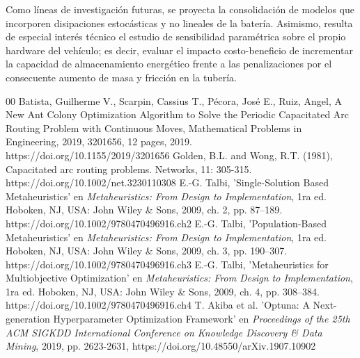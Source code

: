 \documentclass[conference]{IEEEtran}
\begin{document}
Como líneas de investigación futuras, se proyecta la consolidación de modelos que incorporen disipaciones estocásticas y no lineales de la batería. Asimismo, resulta de especial interés técnico el estudio de sensibilidad paramétrica sobre el propio hardware del vehículo; es decir, evaluar el impacto costo-beneficio de incrementar la capacidad de almacenamiento energético frente a las penalizaciones por el consecuente aumento de masa y fricción en la tubería.

\begin{thebibliography}{00}
 Batista, Guilherme V., Scarpin, Cassius T., Pécora, José E., Ruiz, Angel, A New Ant Colony Optimization Algorithm to Solve the Periodic Capacitated Arc Routing Problem with Continuous Moves, Mathematical Problems in Engineering, 2019, 3201656, 12 pages, 2019. https://doi.org/10.1155/2019/3201656
 Golden, B.L. and Wong, R.T. (1981), Capacitated arc routing problems. Networks, 11: 305-315. https://doi.org/10.1002/net.3230110308
 E.-G. Talbi, 'Single-Solution Based Metaheuristics' en \textit{Metaheuristics: From Design to Implementation}, 1ra ed. Hoboken, NJ, USA: John Wiley \& Sons, 2009, ch. 2, pp. 87--189. https://doi.org/10.1002/9780470496916.ch2
 E.-G. Talbi, 'Population-Based Metaheuristics' en \textit{Metaheuristics: From Design to Implementation}, 1ra ed. Hoboken, NJ, USA: John Wiley \& Sons, 2009, ch. 3, pp. 190--307. https://doi.org/10.1002/9780470496916.ch3
 E.-G. Talbi, 'Metaheuristics for Multiobjective Optimization' en \textit{Metaheuristics: From Design to Implementation}, 1ra ed. Hoboken, NJ, USA: John Wiley \& Sons, 2009, ch. 4, pp. 308--384. https://doi.org/10.1002/9780470496916.ch4
 T. Akiba et al. 'Optuna: A Next-generation Hyperparameter Optimization Framework' en \textit{Proceedings of the 25th ACM SIGKDD International Conference on Knowledge Discovery \& Data Mining}, 2019, pp. 2623-2631, https://doi.org/10.48550/arXiv.1907.10902
\end{thebibliography}
\end{document}

